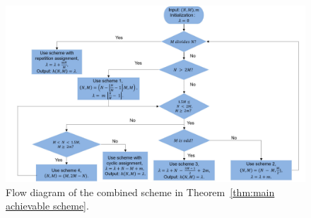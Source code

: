 \documentclass[conference,letterpaper]{IEEEtran}
\begin{document}
\begin{figure}%
\centerline{\includegraphics[scale=0.25]{scheme}}
\caption{\small Flow diagram of the combined scheme in Theorem~\ref{thm:main achievable scheme}.}
\label{fig:scheme} %
\end{figure}
\end{document}
